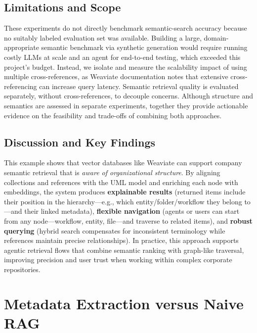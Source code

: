 \subsection{Limitations and Scope}
These experiments do not directly benchmark semantic-search accuracy because no suitably labeled evaluation set was available. Building a large, domain-appropriate semantic benchmark via synthetic generation would require running costly \glspl{LLM} at scale and an agent for end-to-end testing, which exceeded this project's budget. Instead, we isolate and measure the scalability impact of using multiple cross-references, as Weaviate documentation \cite{weaviate} notes that extensive cross-referencing can increase query latency. Semantic retrieval quality is evaluated separately, without cross-references, to decouple concerns. Although structure and semantics are assessed in separate experiments, together they provide actionable evidence on the feasibility and trade-offs of combining both approaches.
\subsection{Discussion and Key Findings}
This example shows that vector databases like Weaviate can support company semantic retrieval that is \textit{aware of organizational structure}. By aligning collections and references with the UML model and enriching each node with embeddings, the system produces \textbf{explainable results} (returned items include their position in the hierarchy—e.g., which entity/folder/workflow they belong to—and their linked metadata), \textbf{flexible navigation} (agents or users can start from any node—workflow, entity, file—and traverse to related items), and \textbf{robust querying} (hybrid search compensates for inconsistent terminology while references maintain precise relationships).
In practice, this approach supports agentic retrieval flows that combine semantic ranking with graph-like traversal, improving precision and user trust when working within complex corporate repositories.


\section{Metadata Extraction versus Naive RAG}
